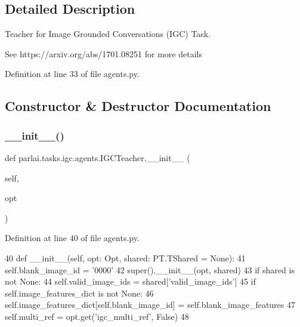 \subsection{Detailed Description}
\begin{DoxyVerb}Teacher for Image Grounded Conversations (IGC) Task.

See https://arxiv.org/abs/1701.08251 for more details
\end{DoxyVerb}
 

Definition at line 33 of file agents.\+py.



\subsection{Constructor \& Destructor Documentation}
\mbox{\label{classparlai_1_1tasks_1_1igc_1_1agents_1_1IGCTeacher_a56ba9c5769024cd49924309006c86c5a}} 
\subsubsection{\texorpdfstring{\+\_\+\+\_\+init\+\_\+\+\_\+()}{\_\_init\_\_()}}
{\footnotesize\ttfamily def parlai.\+tasks.\+igc.\+agents.\+I\+G\+C\+Teacher.\+\_\+\+\_\+init\+\_\+\+\_\+ (\begin{DoxyParamCaption}\item[{}]{self,  }\item[{}]{opt }\end{DoxyParamCaption})}



Definition at line 40 of file agents.\+py.


\begin{DoxyCode}
40     \textcolor{keyword}{def }\_\_init\_\_(self, opt: Opt, shared: PT.TShared = \textcolor{keywordtype}{None}):
41         self.blank\_image\_id = \textcolor{stringliteral}{'0000'}
42         super().\_\_init\_\_(opt, shared)
43         \textcolor{keywordflow}{if} shared \textcolor{keywordflow}{is} \textcolor{keywordflow}{not} \textcolor{keywordtype}{None}:
44             self.valid\_image\_ids = shared[\textcolor{stringliteral}{'valid\_image\_ids'}]
45         \textcolor{keywordflow}{if} self.image\_features\_dict \textcolor{keywordflow}{is} \textcolor{keywordflow}{not} \textcolor{keywordtype}{None}:
46             self.image\_features\_dict[self.blank\_image\_id] = self.blank\_image\_features
47         self.multi\_ref = opt.get(\textcolor{stringliteral}{'igc\_multi\_ref'}, \textcolor{keyword}{False})
48 
\end{DoxyCode}


